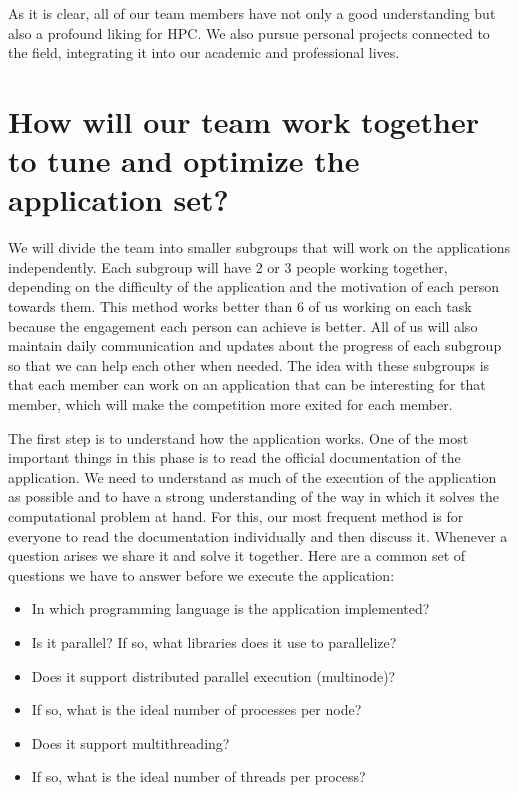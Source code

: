 \documentclass[11pt,a4paper,twocolumn]{article}
\begin{document}
As it is clear, all of our team members have not only a good understanding but also a profound liking for HPC. We also pursue personal projects connected to the field, integrating it into our academic and professional lives.


\section{How will our team work together to tune and optimize the application set?}

We will divide the team into smaller subgroups that will work on the applications independently. Each subgroup will have 2 or 3 people working together, depending on the difficulty of the application and the motivation of each person towards them. This method works better than 6 of us working on each task because the engagement each person can achieve is better. All of us will also maintain daily communication and updates about the progress of each subgroup so that we can help each other when needed. The idea with these subgroups is that each member can work on an application that can be interesting for that member, which will make the competition more exited for each member.

The first step is to understand how the application works. One of the most important things in this phase is to read the official documentation of the application. We need to understand as much of the execution of the application as possible and to have a strong understanding of the way in which it solves the computational problem at hand. For this, our most frequent method is for everyone to read the documentation individually and then discuss it. Whenever a question arises we share it and solve it together. Here are a common set of questions we have to answer before we execute the application:
\begin{itemize}
	\item In which programming language is the application implemented?
	\item Is it parallel? If so, what libraries does it use to parallelize?
	\item Does it support distributed parallel execution (multinode)?
	\item If so, what is the ideal number of processes per node?
	\item Does it support multithreading?
	\item If so, what is the ideal number of threads per process?
\end{itemize}
\end{document}
